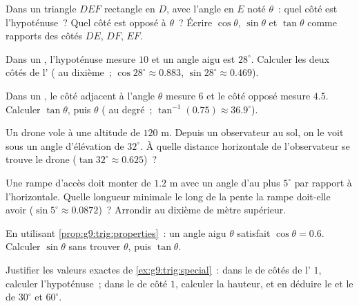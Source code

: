 \begin{exercise}[$\star$]\label{exo:g9:trig:3}
Dans un triangle $DEF$ rectangle en $D$, avec l'angle en $E$ noté
$\theta$~: quel côté est l'hypoténuse~? Quel côté est opposé à
$\theta$~? Écrire $\cos\theta$, $\sin\theta$ et $\tan\theta$ comme
rapports des côtés $DE$, $DF$, $EF$.
\end{exercise}

\begin{exercise}[$\star$]\label{exo:g9:trig:4}
Dans un , l'hypoténuse mesure $10$ et un angle aigu est
$28^\circ$. Calculer les deux côtés de l' ( au
dixième~; $\cos 28^\circ \approx 0.883$, $\sin 28^\circ \approx 0.469$).
\end{exercise}

\begin{exercise}[$\star$]\label{exo:g9:trig:5}
Dans un , le côté adjacent à l'angle $\theta$ mesure
$6$ et le côté opposé mesure $4.5$. Calculer $\tan\theta$, puis $\theta$
( au degré~; $\tan^{-1}(0.75) \approx 36.9^\circ$).
\end{exercise}

\begin{exercise}[$\star\star$]\label{exo:g9:trig:6}
Un drone vole à une altitude de $120$ m. Depuis un observateur au sol, on
le voit sous un angle d'élévation de $32^\circ$. À quelle distance
horizontale de l'observateur se trouve le drone
($\tan 32^\circ \approx 0.625$)~?
\end{exercise}

\begin{exercise}[$\star\star$]\label{exo:g9:trig:7}
Une rampe d'accès doit monter de $1.2$ m avec un angle d'au plus
$5^\circ$ par rapport à l'horizontale. Quelle longueur minimale le long
de la pente la rampe doit-elle avoir ($\sin 5^\circ \approx 0.0872$)~?
Arrondir au dixième de mètre supérieur.
\end{exercise}

\begin{exercise}[$\star\star$]\label{exo:g9:trig:8}
En utilisant \cref{prop:g9:trig:properties}~: un angle aigu $\theta$
satisfait $\cos\theta = 0.6$. Calculer $\sin\theta$ sans trouver
$\theta$, puis $\tan\theta$.
\end{exercise}

\begin{exercise}[$\star\star\star$]\label{exo:g9:trig:9}
Justifier les valeurs exactes de \cref{ex:g9:trig:special}~: dans le
  de côtés de l' $1$, calculer
l'hypoténuse~; dans le  de côté $1$, calculer la
hauteur, et en déduire le  et le  de $30^\circ$ et
$60^\circ$.
\end{exercise}

